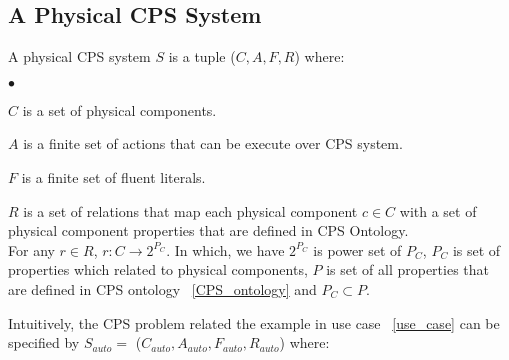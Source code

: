 \subsection{A Physical CPS System}
\begin{definition}
\label{def1} 
A physical CPS system $S$ is a tuple ($C, A, F, R$) where:
%
\begin{list}{$\bullet$}{\itemsep=0pt \parsep=1pt \topsep=1pt \leftmargin=12pt} 
\item $C$ is a set of physical components.
\item $A$ is a finite set of actions that can be execute over CPS system.
\item $F$ is a finite set of fluent literals.
\item $R$ is a set of relations that map each physical component $c \in C$ with a set of physical component properties that are defined in CPS Ontology.  \\
For any $r \in R$, $r : C \longrightarrow 2^{P_{C}}$. In which, we have $2^{P_{C}}$ is power set of $P_{C}$, $P_{C}$ is set of properties which related to physical components, $P$ is set of all properties that are defined in CPS ontology ~\ref{CPS_ontology} and $P_{C} \subset P$. 
\end{list}
%
\end{definition}
%
Intuitively, the CPS problem related the example in use case ~\ref{use_case} can be specified by $S_{auto} = $ ($C_{auto}, A_{auto}, F_{auto}, R_{auto}$) where:
